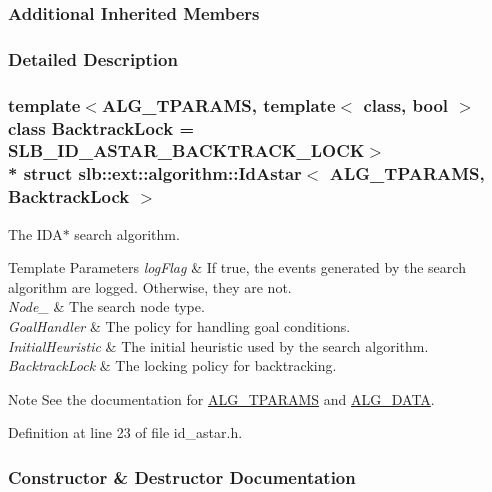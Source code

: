 \subsubsection*{Additional Inherited Members}


\subsubsection{Detailed Description}
\subsubsection*{template$<$A\+L\+G\+\_\+\+T\+P\+A\+R\+A\+MS, template$<$ class, bool $>$ class Backtrack\+Lock = S\+L\+B\+\_\+\+I\+D\+\_\+\+A\+S\+T\+A\+R\+\_\+\+B\+A\+C\+K\+T\+R\+A\+C\+K\+\_\+\+L\+O\+CK$>$\\*
struct slb\+::ext\+::algorithm\+::\+Id\+Astar$<$ A\+L\+G\+\_\+\+T\+P\+A\+R\+A\+M\+S, Backtrack\+Lock $>$}

The {\ttfamily I\+D\+A$\ast$} search algorithm. 


\begin{DoxyTemplParams}{Template Parameters}
{\em log\+Flag} & If {\ttfamily true}, the events generated by the search algorithm are logged. Otherwise, they are not. \\
\hline
{\em Node\+\_\+} & The search node type. \\
\hline
{\em Goal\+Handler} & The policy for handling goal conditions. \\
\hline
{\em Initial\+Heuristic} & The initial heuristic used by the search algorithm. \\
\hline
{\em Backtrack\+Lock} & The locking policy for backtracking. \\
\hline
\end{DoxyTemplParams}
\begin{DoxyNote}{Note}
See the documentation for \hyperlink{algorithm_8h_a521ad67aee0e10fb76ee132a9d5c0768}{A\+L\+G\+\_\+\+T\+P\+A\+R\+A\+MS} and \hyperlink{algorithm_8h_a64c012078deee9a30405e18ec11e6360}{A\+L\+G\+\_\+\+D\+A\+TA}. 
\end{DoxyNote}


Definition at line 23 of file id\+\_\+astar.\+h.



\subsubsection{Constructor \& Destructor Documentation}
